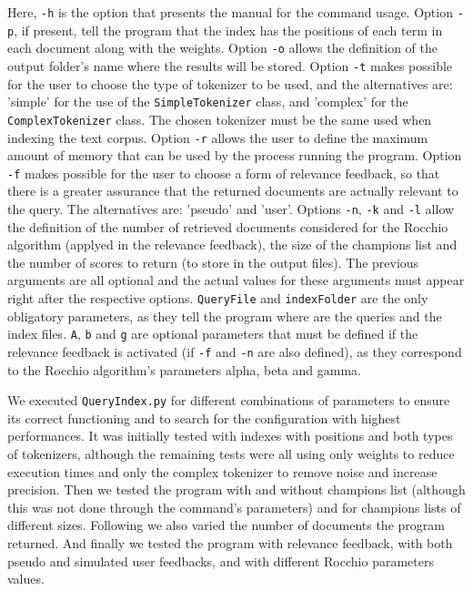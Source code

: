 \documentclass[12pt]{article}
\begin{document}
Here, \texttt{-h} is the option that presents the manual for the command usage.
Option \texttt{-p}, if present, tell the program that the index has the positions
of each term in each document along with the weights.
Option \texttt{-o} allows the definition of the output folder's name where the
results will be stored.
Option \texttt{-t} makes possible for the user to choose the type of tokenizer
to be used, and the alternatives are: 'simple' for the use of the 
\texttt{SimpleTokenizer} class, and 'complex' for the \texttt{ComplexTokenizer} class.
The chosen tokenizer must be the same used when indexing the text corpus.
Option \texttt{-r} allows the user to define the maximum amount of memory that can
be used by the process running the program.
Option \texttt{-f} makes possible for the user to choose a form of relevance 
feedback, so that there is a greater assurance that the returned documents are
actually relevant to the query.
The alternatives are: 'pseudo' and 'user'.
Options \texttt{-n}, \texttt{-k} and \texttt{-l} allow the definition of the 
number of retrieved documents considered for the Rocchio algorithm (applyed in
the relevance feedback), the size of the champions list and the number of scores
to return (to store in the output files).
The previous arguments are all optional and the actual values for these arguments
must appear right after the respective options.
\texttt{QueryFile} and \texttt{indexFolder} are the only obligatory parameters,
as they tell the program where are the queries and the index files.
\texttt{A}, \texttt{b} and \texttt{g} are optional parameters that must be defined
if the relevance feedback is activated (if \texttt{-f} and \texttt{-n} are also
defined), as they correspond to the Rocchio algorithm's parameters alpha, beta
and gamma.

We executed \texttt{QueryIndex.py} for different combinations of parameters to
ensure its correct functioning and to search for the configuration with highest 
performances.
It was initially tested with indexes with positions and both types of tokenizers, 
although the remaining tests were all using only weights to reduce execution times
and only the complex tokenizer to remove noise and increase precision.
Then we tested the program with and without champions list (although this was
not done through the command's parameters) and for champions lists of different sizes.
Following we also varied the number of documents the program returned.
And finally we tested the program with relevance feedback, with both pseudo and
simulated user feedbacks, and with different Rocchio parameters values.
\end{document}
